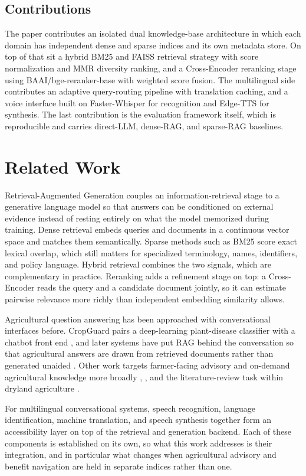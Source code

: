 \documentclass[10pt,twocolumn,letterpaper]{article}
\begin{document}
\subsection{Contributions}
The paper contributes an isolated dual knowledge-base architecture in which each domain has independent dense and sparse indices and its own metadata store. On top of that sit a hybrid BM25 and FAISS retrieval strategy with score normalization and MMR diversity ranking, and a Cross-Encoder reranking stage using BAAI/bge-reranker-base with weighted score fusion. The multilingual side contributes an adaptive query-routing pipeline with translation caching, and a voice interface built on Faster-Whisper for recognition and Edge-TTS for synthesis. The last contribution is the evaluation framework itself, which is reproducible and carries direct-LLM, dense-RAG, and sparse-RAG baselines.

\section{Related Work}
Retrieval-Augmented Generation couples an information-retrieval stage to a generative language model so that answers can be conditioned on external evidence instead of resting entirely on what the model memorized during training. Dense retrieval embeds queries and documents in a continuous vector space and matches them semantically. Sparse methods such as BM25 score exact lexical overlap, which still matters for specialized terminology, names, identifiers, and policy language. Hybrid retrieval combines the two signals, which are complementary in practice. Reranking adds a refinement stage on top: a Cross-Encoder reads the query and a candidate document jointly, so it can estimate pairwise relevance more richly than independent embedding similarity allows.

Agricultural question answering has been approached with conversational interfaces before. CropGuard pairs a deep-learning plant-disease classifier with a chatbot front end \cite{b3}, and later systems have put RAG behind the conversation so that agricultural answers are drawn from retrieved documents rather than generated unaided \cite{b4}. Other work targets farmer-facing advisory and on-demand agricultural knowledge more broadly \cite{b2}, \cite{b5}, and the literature-review task within dryland agriculture \cite{b1}.

For multilingual conversational systems, speech recognition, language identification, machine translation, and speech synthesis together form an accessibility layer on top of the retrieval and generation backend. Each of these components is established on its own, so what this work addresses is their integration, and in particular what changes when agricultural advisory and benefit navigation are held in separate indices rather than one.
\end{document}
